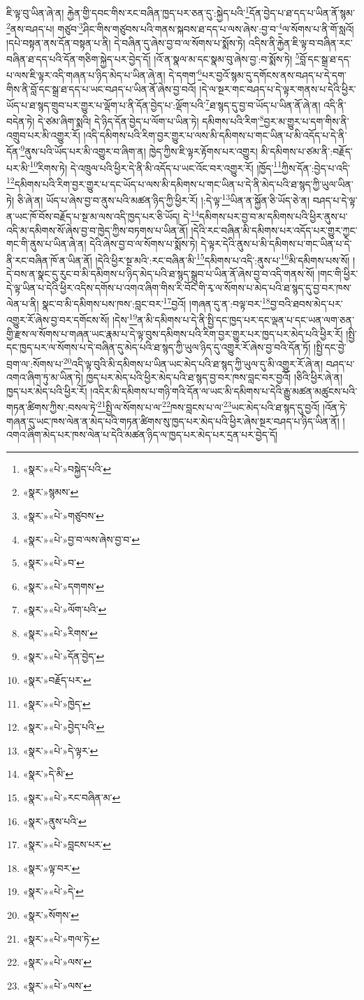 ཇི་ལྟ་བུ་ཡིན་ཞེ་ན། རྐྱེན་གྱི་དབང་གིས་རང་བཞིན་ཁྱད་པར་ཅན་དུ་:སྐྱེད་པའི་\footnote{«སྣར་»«པེ་»བསྐྱེད་པའི་}དོན་བྱེད་པ་ཐ་དད་པ་ཡིན་ནོ་སྙམ་\footnote{«སྣར་»སྙམས་}ནས་བཤད་པ། གཙུབ་\footnote{«སྣར་»«པེ་»གཙུབས་}ཤིང་གིས་གཙུབས་པའི་གནས་སྐབས་ཐ་དད་པ་ལས་ཞེས་:བྱ་བ་\footnote{«སྣར་»«པེ་»བྱ་བ་ལས་ཞེས་བྱ་བ་}ལ་སོགས་པ་ནི་གོ་སླའོ། །དཔེ་བསྟན་ནས་དོན་བསྟན་པ་ནི། དེ་བཞིན་དུ་ཞེས་བྱ་བ་ལ་སོགས་པ་སྨོས་ཏེ། འདིས་ནི་རྐྱེན་ཇི་ལྟ་བ་བཞིན་རང་བཞིན་ཐ་དད་པའི་དོན་གཅིག་སྐྱེད་པར་བྱེད་དོ། །འོ་ན་སྣལ་མ་དང་སྣམ་བུ་ཞེས་བྱ་:བ་སྨོས་ཏེ། \footnote{«སྣར་»«པེ་»བ་}བློ་དང་སྒྲ་ཐ་དད་པ་ལས་ཇི་ལྟར་འདི་གཞན་པ་ཉིད་མེད་པ་ཡིན་ཞེ་ན། དེ་དགག་\footnote{«སྣར་»«པེ་»དགགས་}པར་བྱའོ་སྙམ་དུ་དགོངས་ནས་བཤད་པ་དེ་དག་གིས་ནི་བློ་དང་སྒྲ་ཐ་དད་པ་ཡང་བཤད་པ་ཡིན་ནོ་ཞེས་བྱ་བའོ། །དེ་ལ་སྔར་གང་བཤད་པ་དེ་ལྟར་གནས་པ་དེའི་ཕྱིར་ཡོད་པ་ཐ་སྙད་གྲུབ་པར་གྱུར་པ་ལྡོག་པ་ནི་དོན་བྱེད་པ་:ལྡོག་པའི་\footnote{«སྣར་»«པེ་»ལོག་པའི་}ཐ་སྙད་དུ་བྱ་བ་ཡོད་པ་ཡིན་ནོ་ཞེ་ན། འདི་ནི་བདེན་ཏེ། དེ་ཙམ་ཞིག་སྨའི། དེ་ཉིད་དོན་བྱེད་པ་ལོག་པ་ཡིན་ཏེ། དམིགས་པའི་རིག་\footnote{«སྣར་»«པེ་»རིགས་}བྱར་མ་གྱུར་པ་དག་གིས་ནི་འགྲུབ་པར་མི་འགྱུར་རོ། །འདི་དམིགས་པའི་རིག་བྱར་གྱུར་པ་ལས་མི་དམིགས་པ་གང་ཡིན་པ་མི་འདོད་པ་དེ་ནི་དོན་\footnote{«སྣར་»«པེ་»དོན་བྱེད་}ནུས་པའི་ཡོད་པར་མི་འགྱུར་བ་ཞིག་ན། ཁྱེད་ཀྱིས་ཇི་ལྟར་རྟོགས་པར་འགྱུར། མི་དམིགས་པ་ཙམ་ནི་:བརྗོད་པར་མི་\footnote{«སྣར་»བརྗོད་པར་}རིགས་ཏེ། དེ་འཁྲུལ་པའི་ཕྱིར་དེ་ནི་མི་འདོད་པ་ཡང་འོང་བར་འགྱུར་རོ། །ཁྱོད་\footnote{«སྣར་»«པེ་»ཁྱེད་}ཀྱིས་དོན་:བྱེད་པ་འདི་\footnote{«སྣར་»«པེ་»བྱེད་པའི་}དམིགས་པའི་རིག་བྱར་གྱུར་པ་དང་ཡོད་པ་ལས་མི་དམིགས་པ་གང་ཡིན་པ་དེ་ནི་མེད་པའི་ཐ་སྙད་ཀྱི་ཡུལ་ཡིན་ཏེ། ཅི་ཞེ་ན། ཡོད་པ་ཞེས་བྱ་བ་ནུས་པའི་མཚན་ཉིད་ཀྱི་ཕྱིར་རོ། །:དེ་ལྟ་\footnote{«སྣར་»«པེ་»དེ་ལྟར་}ཡིན་ན་སྐྱོན་ཅི་ཡོད་ཅེ་ན། བཤད་པ་དེ་ལྟ་ན་ཡང་ཁོ་བོས་བརྗོད་པ་སྔ་མ་ལས་འདི་ཁྱད་པར་ཅི་ཡོད། དེ་\footnote{«སྣར་»དེ་མི་}དམིགས་པར་བྱ་བ་མ་དམིགས་པའི་ཕྱིར་ནུས་པ་འདི་མ་དམིགས་སོ་ཞེས་བྱ་བ་ཁྱེད་ཀྱིས་བཏགས་པ་ཡིན་ནོ། །དེའི་རང་བཞིན་མི་དམིགས་པར་འདོད་པར་གྱུར་ཀྱང་གང་གི་ནུས་པ་ཡིན་ཞེ་ན། དེའི་ཞེས་བྱ་བ་ལ་སོགས་པ་སྨོས་ཏེ། དེ་ལྟར་དེའི་ནུས་པ་མི་དམིགས་པ་གང་ཡིན་པ་དེ་ནི་རང་བཞིན་ཁོ་ན་ཡིན་ནོ། །དེའི་ཕྱིར་སྔ་མའི་:རང་བཞིན་མི་\footnote{«སྣར་»«པེ་»རང་བཞིན་མ་}དམིགས་པ་འདི་:ནུས་པ་\footnote{«སྣར་»ནུས་པའི་}མི་དམིགས་པས་སོ། །དེ་བས་ན་སྣང་དུ་རུང་བ་མི་དམིགས་པ་ཉིད་མེད་པའི་ཐ་སྙད་སྒྲུབ་པ་ཡིན་ནོ་ཞེས་བྱ་བ་འདི་གནས་སོ། །གང་གི་ཕྱིར་དེ་ལྟ་ཡིན་པ་དེའི་ཕྱིར་འདིས་དགོས་པ་འགའ་ཞིག་གིས་རི་བོང་གི་རྭ་ལ་སོགས་པ་མེད་པའི་ཐ་སྙད་དུ་བྱ་བར་ཁས་ལེན་པ་ནི། སྣང་བ་མི་དམིགས་པས་ཁས་:བླང་བར་\footnote{«སྣར་»«པེ་»བླངས་པར་}བྱའོ། །གཞན་དུ་ན་:བལྟ་བར་\footnote{«སྣར་»ལྟ་བར་}བྱ་བའི་ཐབས་མེད་པར་འགྱུར་རོ་ཞེས་བྱ་བར་དགོངས་སོ། །དེས་\footnote{«སྣར་»«པེ་»དེ་}ན་མི་དམིགས་པ་དེ་ནི་སྤྱི་དང་ཁྱད་པར་དང་ལྡན་པ་དང་ཡན་ལག་ཅན་གྱི་རྫས་ལ་སོགས་པ་གཞན་ཡང་རྣམ་པ་དེ་ལྟ་བུས་དམིགས་པའི་རིག་བྱར་གྱུར་པར་ཁྱད་པར་མེད་པའི་ཕྱིར་རོ། །སྤྱི་དང་ཁྱད་པར་ལ་སོགས་པ་དེ་བཞིན་དུ་མེད་པའི་ཐ་སྙད་ཀྱི་ཡུལ་ཉིད་དུ་འགྱུར་རོ་ཞེས་བྱ་བའི་དོན་ཏོ། །སྤྱི་དང་བྱེ་བྲག་ལ་:སོགས་པ་\footnote{«སྣར་»སོགས་}འདི་ལྟ་བུའི་མི་དམིགས་པ་ཡིན་ཡང་མེད་པའི་ཐ་སྙད་ཀྱི་ཡུལ་དུ་མི་འགྱུར་རོ་ཞེ་ན། བཤད་པ་འགའ་ཞིག་ཏུ་མ་ཡིན་ཏེ། ཁྱད་པར་མེད་པའི་ཕྱིར་མེད་པའི་ཐ་སྙད་བྱ་བར་ཁས་བླང་བར་བྱའོ། །ཅིའི་ཕྱིར་ཞེ་ན། ཁྱད་པར་མེད་པའི་ཕྱིར་རོ། །འདིར་མི་དམིགས་པ་གཉི་གའི་དོན་ལ་ཡང་མི་དམིགས་པ་དེའི་རྒྱུ་མཚན་མཚུངས་པའི་གཏན་ཚིགས་ཀྱིས་:བསལ་ཏེ་\footnote{«སྣར་»«པེ་»གལ་ཏེ་}སྤྱི་ལ་སོགས་པ་ལ་\footnote{«སྣར་»«པེ་»ལས་}ཁས་བླངས་པ་ལ་\footnote{«སྣར་»«པེ་»ལས་}ཡང་མེད་པའི་ཐ་སྙད་དུ་བྱའོ། །འོན་ཏེ་གཞན་དུ་ཡང་ཁས་ལེན་ན་མེད་པའི་གཏན་ཚིགས་སུ་ཁྱད་པར་མེད་པའི་ཕྱིར་ཞེས་སྔར་བཤད་པ་ཉིད་ཡིན་ནོ། །འགའ་ཞིག་མེད་པར་ཁས་ལེན་པ་དེའི་མཚན་ཉིད་ལ་ཁྱད་པར་མེད་པར་དྲན་པར་བྱེད་དོ། 